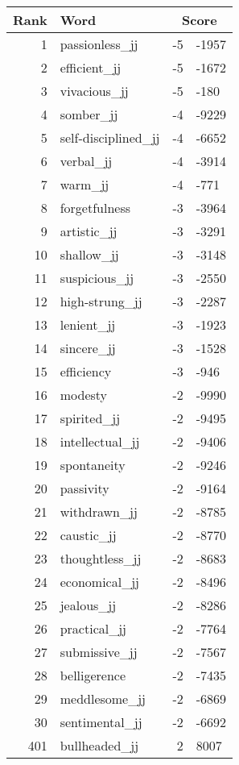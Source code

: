 \begin{longtable}[!htbp]{| rlr@{.}l |}
    \hline
    \textbf{Rank} & \textbf{Word} & \multicolumn{2}{c|}{\textbf{Score}} \\
    \hline
    \endhead
    1 & passionless\_jj & -5 & -1957 \\
    2 & efficient\_jj & -5 & -1672 \\
    3 & vivacious\_jj & -5 & -180 \\
    4 & somber\_jj & -4 & -9229 \\
    5 & self-disciplined\_jj & -4 & -6652 \\
    6 & verbal\_jj & -4 & -3914 \\
    7 & warm\_jj & -4 & -771 \\
    8 & forgetfulness & -3 & -3964 \\
    9 & artistic\_jj & -3 & -3291 \\
    10 & shallow\_jj & -3 & -3148 \\
    11 & suspicious\_jj & -3 & -2550 \\
    12 & high-strung\_jj & -3 & -2287 \\
    13 & lenient\_jj & -3 & -1923 \\
    14 & sincere\_jj & -3 & -1528 \\
    15 & efficiency & -3 & -946 \\
    16 & modesty & -2 & -9990 \\
    17 & spirited\_jj & -2 & -9495 \\
    18 & intellectual\_jj & -2 & -9406 \\
    19 & spontaneity & -2 & -9246 \\
    20 & passivity & -2 & -9164 \\
    21 & withdrawn\_jj & -2 & -8785 \\
    22 & caustic\_jj & -2 & -8770 \\
    23 & thoughtless\_jj & -2 & -8683 \\
    24 & economical\_jj & -2 & -8496 \\
    25 & jealous\_jj & -2 & -8286 \\
    26 & practical\_jj & -2 & -7764 \\
    27 & submissive\_jj & -2 & -7567 \\
    28 & belligerence & -2 & -7435 \\
    29 & meddlesome\_jj & -2 & -6869 \\
    30 & sentimental\_jj & -2 & -6692 \\
    401 & bullheaded\_jj & 2 & 8007 \\

\end{longtable}
